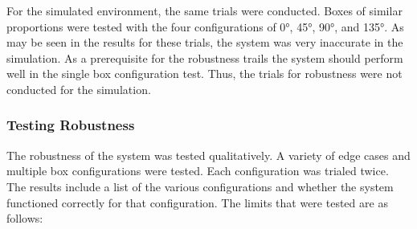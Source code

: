 \documentclass[letterpaper, 10 pt, conference]{conf/ieeeconf}  %
\begin{document}
For the simulated environment, the same trials were conducted. Boxes of similar
proportions were tested with the four configurations of \ang{0}, \ang{45},
\ang{90}, and \ang{135}. As may be seen in the results for these trials, the
system was very inaccurate in the simulation. As a prerequisite for the
robustness trails the system should perform well in the single box configuration
test. Thus, the trials for robustness were not conducted for the simulation.

\subsubsection{Testing Robustness}
The robustness of the system was tested qualitatively. A variety of edge cases
and multiple box configurations were tested. Each configuration was trialed
twice. The results include a list of the various configurations and whether the
system functioned correctly for that configuration. The limits that were tested
are as follows:
\end{document}
